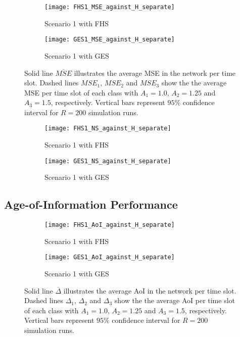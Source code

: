 \begin{figure}[htbp]
  \centering
  \begin{subfigure}[b]{0.49\textwidth}
      \centering
      \texttt{[image: FHS1\_MSE\_against\_H\_separate]}
      \caption{Scenario 1 with FHS}
  \end{subfigure}
  \hfill
  \begin{subfigure}[b]{0.49\textwidth}
      \centering
      \texttt{[image: GES1\_MSE\_against\_H\_separate]}
      \caption{Scenario 1 with GES}
  \end{subfigure}
     \caption[Scenario 1: Average MSE vs. finite horizon $H$]{Solid line
     $\overline{MSE}$ illustrates the average MSE in the network per time slot.
     Dashed lines $MSE_1$, $MSE_2$ and $MSE_3$ show the the average MSE per time
     slot of each class with $A_1=1.0$, $A_2=1.25$ and $A_3=1.5$, respectively.
     Vertical bars represent $95\%$ confidence interval for $R=200$ simulation
     runs.}
     \label{fig:MSEavg}
\end{figure}

\begin{figure}[htbp]
  \centering
  \begin{subfigure}[b]{0.49\textwidth}
      \centering
      \texttt{[image: FHS1\_NS\_against\_H\_separate]}
      \caption{Scenario 1 with FHS}
  \end{subfigure}
  \hfill
  \begin{subfigure}[b]{0.49\textwidth}
      \centering
      \texttt{[image: GES1\_NS\_against\_H\_separate]}
      \caption{Scenario 1 with GES}
  \end{subfigure}
     \caption[Scenario1: Network resources share among heterogenous subsystems
     vs. finite horizon $H$]{}
     \label{fig:networkshare}
\end{figure}


\subsection{Age-of-Information Performance}

\begin{figure}[htbp]
  \centering
  \begin{subfigure}[b]{0.49\textwidth}
      \centering
      \texttt{[image: FHS1\_AoI\_against\_H\_separate]}
      \caption{Scenario 1 with FHS}
  \end{subfigure}
  \hfill
  \begin{subfigure}[b]{0.49\textwidth}
      \centering
      \texttt{[image: GES1\_AoI\_against\_H\_separate]}
      \caption{Scenario 1 with GES}
  \end{subfigure}
     \caption[Scenario 1: Average AoI vs. finite horizon $H$ for Scenario
     1]{Solid line $\overline{\Delta}$ illustrates the average AoI in the
     network per time slot. Dashed lines $\Delta_1$, $\Delta_2$ and $\Delta_3$
     show the the average AoI per time slot of each class with $A_1 = 1.0$,
     $A_2=1.25$ and $A_3=1.5$, respectively. Vertical bars represent $95\%$
     confidence interval for $R=200$ simulation runs.}
     \label{fig:AoIseperate}
\end{figure}


